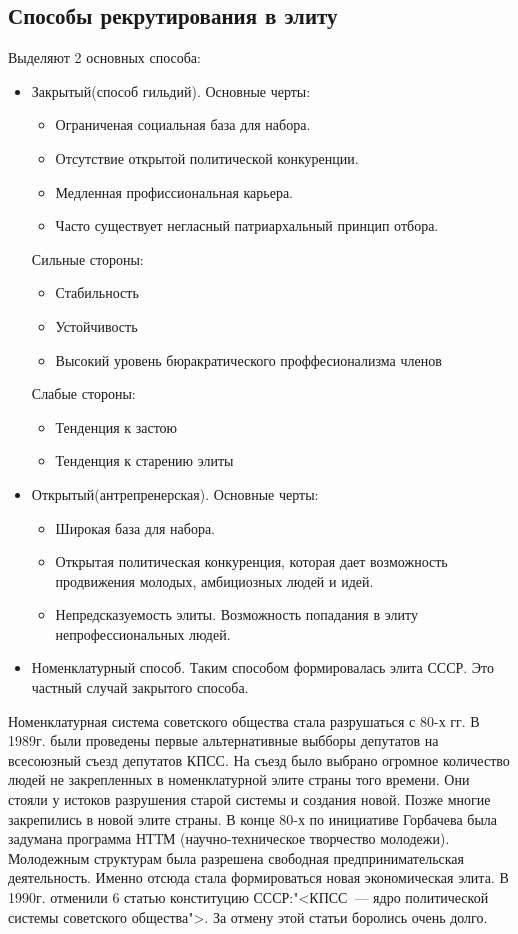\subsection{Способы рекрутирования в элиту}
Выделяют 2 основных способа:
\begin{itemize}
	\item Закрытый(способ гильдий). Основные черты:
		\begin{itemize}
			\item Ограниченая социальная база для набора.
			\item Отсутствие открытой политической конкуренции.
			\item Медленная профиссиональная карьера.
			\item Часто существует негласный патриархальный принцип отбора.
		\end{itemize}
		Сильные стороны:
		\begin{itemize}
			\item Стабильность
			\item Устойчивость
			\item Высокий уровень бюракратического проффесионализма членов
		\end{itemize}
		Слабые стороны:
		\begin{itemize}
			\item Тенденция к застою
			\item Тенденция к старению элиты
		\end{itemize}
	\item Открытый(антрепренерская). Основные черты:
		\begin{itemize}
			\item Широкая база для набора.
			\item Открытая политическая конкуренция, которая дает возможность продвижения молодых, амбициозных людей и идей.
			\item Непредсказуемость элиты. Возможность попадания в элиту непрофессиональных людей.
		\end{itemize}
	\item Номенклатурный способ. Таким способом формировалась элита СССР. Это частный случай закрытого способа.
\end{itemize}
Номенклатурная система советского общества стала разрушаться с 80-х гг. В 1989г. были проведены первые альтернативные выбборы депутатов на всесоюзный съезд депутатов КПСС. На съезд было выбрано огромное количество людей не закрепленных в номенклатурной элите страны того времени. Они стояли у истоков разрушения старой системы и создания новой. Позже многие закрепились в новой элите страны. В конце 80-х по инициативе Горбачева была задумана программа НТТМ (научно-техническое творчество молодежи). Молодежным структурам была разрешена свободная предпринимательская деятельность. Именно отсюда стала формироваться новая экономическая элита. В 1990г. отменили 6 статью конституцию СССР:"<КПСС~--- ядро политической системы советского общества">. За отмену этой статьи боролись очень долго.


